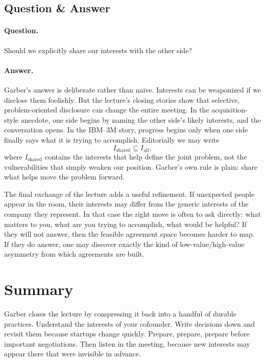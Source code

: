 \subsection{Question \& Answer}

\paragraph{Question.} Should we explicitly share our interests with the other side?

\paragraph{Answer.} Garber's answer is deliberate rather than naive. Interests can be weaponized if we disclose them foolishly. But the lecture's closing stories show that selective, problem-oriented disclosure can change the entire meeting. In the acquisition-style anecdote, one side begins by naming the other side's likely interests, and the conversation opens. In the IBM--3M story, progress begins only when one side finally says what it is trying to accomplish. Editorially we may write
\begin{equation}
I_{\text{shared}} \subseteq I_{\text{all}},
\end{equation}
where \(I_{\text{shared}}\) contains the interests that help define the joint problem, not the vulnerabilities that simply weaken our position. Garber's own rule is plain: share what helps move the problem forward.

The final exchange of the lecture adds a useful refinement. If unexpected people appear in the room, their interests may differ from the generic interests of the company they represent. In that case the right move is often to ask directly: what matters to you, what are you trying to accomplish, what would be helpful? If they will not answer, then the feasible agreement space becomes harder to map. If they do answer, one may discover exactly the kind of low-value/high-value asymmetry from which agreements are built.

\section{Summary}

Garber closes the lecture by compressing it back into a handful of durable practices. Understand the interests of your cofounder. Write decisions down and revisit them because startups change quickly. Prepare, prepare, prepare before important negotiations. Then listen in the meeting, because new interests may appear there that were invisible in advance.

